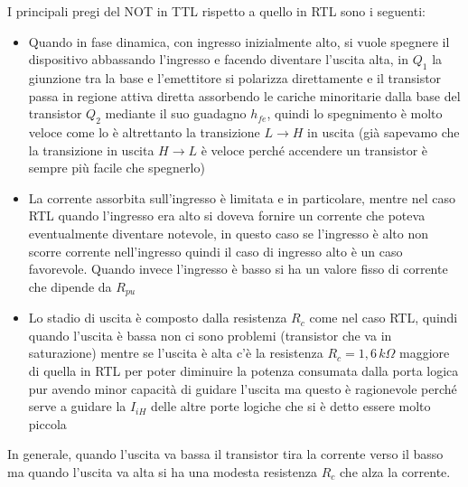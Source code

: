 \documentclass[12pt, a4paper]{report}
\begin{document}
I principali pregi del NOT in TTL rispetto a quello in RTL sono i seguenti:
\begin{itemize}
    \item Quando in fase dinamica, con ingresso inizialmente alto, si vuole spegnere il dispositivo abbassando l'ingresso e facendo diventare l'uscita alta, in $Q_1$ la giunzione tra la base e l'emettitore si polarizza direttamente e il transistor passa in regione attiva diretta assorbendo le cariche minoritarie dalla base del transistor $Q_2$ mediante il suo guadagno $h_{fe}$, quindi lo spegnimento è molto veloce come lo è altrettanto la transizione $L \rightarrow H$ in uscita (già sapevamo che la transizione in uscita $H \rightarrow L$ è veloce perché accendere un transistor è sempre più facile che spegnerlo)
    \item La corrente assorbita sull'ingresso è limitata e in particolare, mentre nel caso RTL quando l'ingresso era alto si doveva fornire un corrente che poteva eventualmente diventare notevole, in questo caso se l'ingresso è alto non scorre corrente nell'ingresso quindi il caso di ingresso alto è un caso favorevole. Quando invece l'ingresso è basso si ha un valore fisso di corrente che dipende da $R_{pu}$
    \item Lo stadio di uscita è composto dalla resistenza $R_c$ come nel caso RTL, quindi quando l'uscita è bassa non ci sono problemi (transistor che va in saturazione) mentre se l'uscita è alta c'è la resistenza $R_c = 1,6\,k\Omega$ maggiore di quella in RTL per poter diminuire la potenza consumata dalla porta logica pur avendo minor capacità di guidare l'uscita ma questo è ragionevole perché serve a guidare la $I_{iH}$ delle altre porte logiche che si è detto essere molto piccola
\end{itemize}
In generale, quando l'uscita va bassa il transistor tira la corrente verso il basso ma quando l'uscita va alta si ha una modesta resistenza $R_c$ che alza la corrente.
\end{document}
